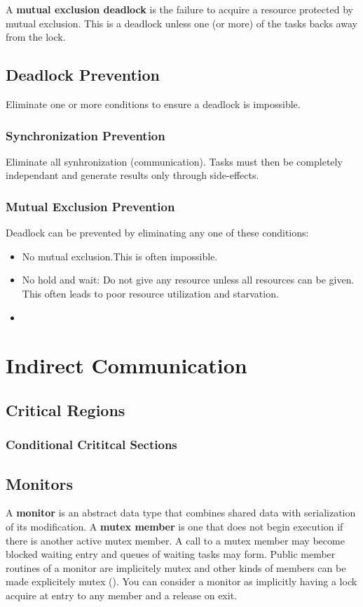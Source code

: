 \documentclass[12pt]{article}
\begin{document}
A {\bf mutual exclusion deadlock} is the failure to acquire a resource protected by mutual exclusion. This is a deadlock unless one (or more) of the tasks backs away from the lock.

\subsection{Deadlock Prevention}
Eliminate one or more conditions to ensure a deadlock is impossible.

\subsubsection{Synchronization Prevention}
Eliminate all synhronization (communication). Tasks must then be completely independant and generate results only through side-effects.

\subsubsection{Mutual Exclusion Prevention}
Deadlock can be prevented by eliminating any one of these conditions:
\begin{itemize}
\item No mutual exclusion.This is often impossible.
\item No hold and wait: Do not give any resource unless all resources can be given. This often leads to poor resource utilization and starvation.
\item
\end{itemize}


\section{Indirect Communication}
\subsection{Critical Regions}

\subsubsection{Conditional Crititcal Sections}

\subsection{Monitors}
A {\bf monitor} is an abstract data type that combines shared data with serialization of its modification. A {\bf mutex member} is one that does not begin execution if there is another active mutex member. A call to a mutex member may become blocked waiting entry and queues of waiting tasks may form. Public member routines of a monitor are implicitely mutex and other kinds of members can be made explicitely mutex (). You can consider a monitor as implicitly having a lock acquire at entry to any member and a release on exit.
\end{document}
